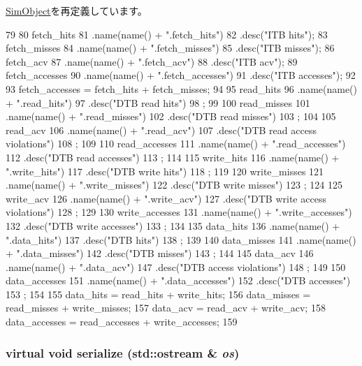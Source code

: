 \hyperlink{classSimObject_a4dc637449366fcdfc4e764cdf12d9b11}{SimObject}を再定義しています。


\begin{DoxyCode}
79 {
80     fetch_hits
81         .name(name() + ".fetch_hits")
82         .desc("ITB hits");
83     fetch_misses
84         .name(name() + ".fetch_misses")
85         .desc("ITB misses");
86     fetch_acv
87         .name(name() + ".fetch_acv")
88         .desc("ITB acv");
89     fetch_accesses
90         .name(name() + ".fetch_accesses")
91         .desc("ITB accesses");
92 
93     fetch_accesses = fetch_hits + fetch_misses;
94 
95     read_hits
96         .name(name() + ".read_hits")
97         .desc("DTB read hits")
98         ;
99 
100     read_misses
101         .name(name() + ".read_misses")
102         .desc("DTB read misses")
103         ;
104 
105     read_acv
106         .name(name() + ".read_acv")
107         .desc("DTB read access violations")
108         ;
109 
110     read_accesses
111         .name(name() + ".read_accesses")
112         .desc("DTB read accesses")
113         ;
114 
115     write_hits
116         .name(name() + ".write_hits")
117         .desc("DTB write hits")
118         ;
119 
120     write_misses
121         .name(name() + ".write_misses")
122         .desc("DTB write misses")
123         ;
124 
125     write_acv
126         .name(name() + ".write_acv")
127         .desc("DTB write access violations")
128         ;
129 
130     write_accesses
131         .name(name() + ".write_accesses")
132         .desc("DTB write accesses")
133         ;
134 
135     data_hits
136         .name(name() + ".data_hits")
137         .desc("DTB hits")
138         ;
139 
140     data_misses
141         .name(name() + ".data_misses")
142         .desc("DTB misses")
143         ;
144 
145     data_acv
146         .name(name() + ".data_acv")
147         .desc("DTB access violations")
148         ;
149 
150     data_accesses
151         .name(name() + ".data_accesses")
152         .desc("DTB accesses")
153         ;
154 
155     data_hits = read_hits + write_hits;
156     data_misses = read_misses + write_misses;
157     data_acv = read_acv + write_acv;
158     data_accesses = read_accesses + write_accesses;
159 }
\end{DoxyCode}
\hypertarget{classAlphaISA_1_1TLB_ad6272f80ae37e8331e3969b3f072a801}{
\subsubsection[{serialize}]{\setlength{\rightskip}{0pt plus 5cm}virtual void serialize (std::ostream \& {\em os})}}
\label{classAlphaISA_1_1TLB_ad6272f80ae37e8331e3969b3f072a801}


